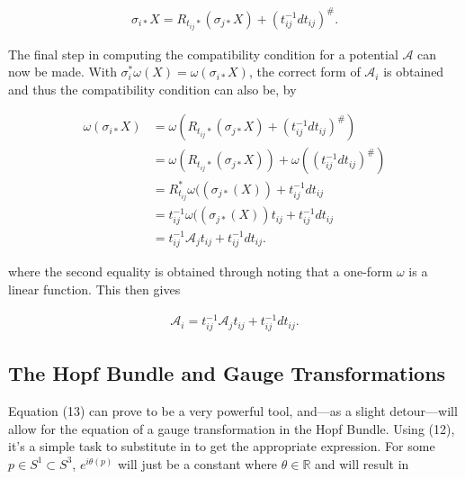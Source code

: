 \documentclass[fleqn, twocolumn, 10pt]{article}
\begin{document}
\begin{ceqn}
\begin{align*}
\sigma_{i\ast}X = R_{t_{ij}\ast}(\sigma_{j\ast}X) + (t^{-1}_{ij}dt_{ij})^\#. 
\end{align*}
\end{ceqn}

The final step in computing the compatibility condition for a potential $\mathcal{A}$ can now be made. With $\sigma^\ast_{i}\omega(X) = \omega(\sigma_{i\ast}X)$, the correct form of $\mathcal{A}_i$ is obtained and thus the compatibility condition can also be, by 

\begin{ceqn}
\begin{align*}
\omega(\sigma_{i\ast}X) &= \omega(R_{t_{ij}\ast}(\sigma_{j\ast}X) + (t^{-1}_{ij}dt_{ij})^\#)\\ 
&= \omega(R_{t_{ij}\ast}(\sigma_{j\ast}X)) + \omega((t^{-1}_{ij}dt_{ij})^\#)\\ 
&= R^\ast_{t_{ij}}\omega((\sigma_{j\ast}(X)) + t^{-1}_{ij}dt_{ij}\\ 
&= t^{-1}_{ij}\omega((\sigma_{j\ast}(X))t_{ij} + t^{-1}_{ij}dt_{ij}\\
&= t^{-1}_{ij}\mathcal{A}_jt_{ij} + t^{-1}_{ij}dt_{ij}. 
\end{align*}
\end{ceqn}
where the second equality is obtained through noting that a one-form $\omega$ is a linear function. This then gives \cite{nakahara2003geometry, kai2015lam, schuller2014geometric, recknagel2006bundles}

\begin{ceqn}
\begin{align}\tag{13}
\mathcal{A}_i = t^{-1}_{ij}\mathcal{A}_jt_{ij} + t^{-1}_{ij}dt_{ij}. 
\end{align}
\end{ceqn}


\subsection{The Hopf Bundle and Gauge Transformations}

Equation (13) can prove to be a very powerful tool, and---as a slight detour---will allow for the equation of a gauge transformation in the Hopf Bundle. Using (12), it's a simple task to substitute in to get the appropriate expression. For some $p \in S^1 \subset S^3$, $e^{i\theta(p)}$ will just be a constant where $\theta \in \mathbb{R}$ and will result in
\end{document}
